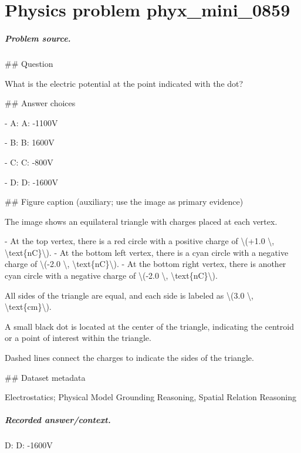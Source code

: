 
\chapter{Physics problem phyx\_mini\_0859}
\label{ch:PhyXMiniProblems_problem_phyx_mini_0859}

\paragraph{Problem source.}
\#\# Question

What is the electric potential at the point indicated with the dot?

\#\# Answer choices

- A: A: -1100V

- B: B: 1600V

- C: C: -800V

- D: D: -1600V

\#\# Figure caption (auxiliary; use the image as primary evidence)

The image shows an equilateral triangle with charges placed at each vertex. 

- At the top vertex, there is a red circle with a positive charge of \textbackslash{}(+1.0 \textbackslash{}, \textbackslash{}text\{nC\}\textbackslash{}).
- At the bottom left vertex, there is a cyan circle with a negative charge of \textbackslash{}(-2.0 \textbackslash{}, \textbackslash{}text\{nC\}\textbackslash{}).
- At the bottom right vertex, there is another cyan circle with a negative charge of \textbackslash{}(-2.0 \textbackslash{}, \textbackslash{}text\{nC\}\textbackslash{}).

All sides of the triangle are equal, and each side is labeled as \textbackslash{}(3.0 \textbackslash{}, \textbackslash{}text\{cm\}\textbackslash{}).

A small black dot is located at the center of the triangle, indicating the centroid or a point of interest within the triangle. 

Dashed lines connect the charges to indicate the sides of the triangle.

\#\# Dataset metadata

Electrostatics; Physical Model Grounding Reasoning, Spatial Relation Reasoning

\paragraph{Recorded answer/context.}
D: D: -1600V

